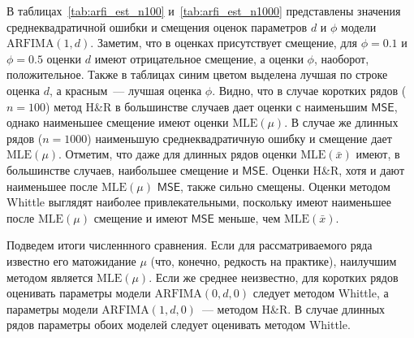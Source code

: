 \documentclass[specialist,
substylefile = spbu_report.rtx,
subf,href,colorlinks=true, 12pt]{disser}
\theoremstyle{definition}
\begin{document}
В таблицах~\ref{tab:arfi_est_n100} и~\ref{tab:arfi_est_n1000} представлены значения среднеквадратичной ошибки и смещения оценок параметров $d$ и $\phi$ модели $\mathrm{ARFIMA}(1, d)$. Заметим, что в оценках присутствует смещение, для $\phi=0.1$ и $\phi=0.5$ оценки $d$ имеют отрицательное смещение, а оценки $\phi$, наоборот, положительное. Также в таблицах синим цветом выделена лучшая по строке оценка $d$, а красным~--- лучшая оценка $\phi$. Видно, что в случае коротких рядов ($n=100$) метод H\&R в большинстве случаев дает оценки с наименьшим $\mathsf{MSE}$, однако наименьшее смещение имеют оценки $\mathrm{MLE}(\mu)$. В случае же длинных рядов ($n=1000$) наименьшую среднеквадратичную ошибку и смещение дает $\mathrm{MLE}(\mu)$. Отметим, что даже для длинных рядов оценки $\mathrm{MLE}(\bar x)$ имеют, в большинстве случаев, наибольшее смещение и $\mathsf{MSE}$. Оценки H\&R, хотя и дают наименьшее после $\mathrm{MLE}(\mu)$ $\mathsf{MSE}$, также сильно смещены. Оценки методом Whittle выглядят наиболее привлекательными, поскольку имеют наименьшее после $\mathrm{MLE}(\mu)$ смещение и имеют $\mathsf{MSE}$ меньше, чем $\mathrm{MLE}(\bar x)$.

Подведем итоги численнного сравнения. Если для рассматриваемого ряда известно его матожидание $\mu$ (что, конечно, редкость на практике), наилучшим методом является $\mathrm{MLE}(\mu)$. Если же среднее неизвестно, для коротких рядов оценивать параметры модели $\mathrm{ARFIMA}(0, d, 0)$ следует методом Whittle, а параметры модели $\mathrm{ARFIMA}(1, d, 0)$~--- методом H\&R. В случае длинных рядов параметры обоих моделей следует оценивать методом Whittle.
\end{document}
